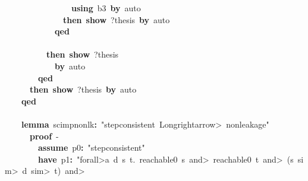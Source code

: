 \documentclass{article}
\newcommand{\syntaxKEYWORDA}[1]{\textcolor[rgb]{0.0,0.4,0.6}{\textbf{#1}}}
\newcommand{\syntaxKEYWORDC}[1]{\textcolor[rgb]{0.0,0.6,1.0}{\textbf{#1}}}
\newcommand{\syntaxLITERALA}[1]{\textcolor[rgb]{1.0,0.0,0.8}{#1}}
\newcommand{\syntaxOPERATOR}[1]{\textcolor[rgb]{0.0,0.0,0.0}{\textbf{#1}}}
\newcommand{\syntaxKEYWORDA}[1]{\textcolor[rgb]{0.0,0.4,0.6}{\textbf{#1}}}
\newcommand{\syntaxKEYWORDC}[1]{\textcolor[rgb]{0.0,0.6,1.0}{\textbf{#1}}}
\newcommand{\syntaxLITERALA}[1]{\textcolor[rgb]{1.0,0.0,0.8}{#1}}
\newcommand{\syntaxOPERATOR}[1]{\textcolor[rgb]{0.0,0.0,0.0}{\textbf{#1}}}
\newcommand{\syntaxKEYWORDA}[1]{\textcolor[rgb]{0.0,0.4,0.6}{\textbf{#1}}}
\newcommand{\syntaxKEYWORDC}[1]{\textcolor[rgb]{0.0,0.6,1.0}{\textbf{#1}}}
\newcommand{\syntaxLITERALA}[1]{\textcolor[rgb]{1.0,0.0,0.8}{#1}}
\newcommand{\syntaxOPERATOR}[1]{\textcolor[rgb]{0.0,0.0,0.0}{\textbf{#1}}}
\newcommand{\syntaxKEYWORDA}[1]{\textcolor[rgb]{0.0,0.4,0.6}{#1}}
\newcommand{\syntaxKEYWORDC}[1]{\textcolor[rgb]{0.0,0.6,1.0}{#1}}
\newcommand{\syntaxLITERALA}[1]{\textcolor[rgb]{1.0,0.0,0.8}{\textbf{#1}}}
\newcommand{\syntaxOPERATOR}[1]{\textcolor[rgb]{0.0,0.0,0.0}{#1}}
\newcommand{\syntaxKEYWORDA}[1]{\textcolor[rgb]{0.0,0.4,0.6}{\textbf{#1}}}
\newcommand{\syntaxKEYWORDC}[1]{\textcolor[rgb]{0.0,0.6,1.0}{\textbf{#1}}}
\newcommand{\syntaxLITERALA}[1]{\textcolor[rgb]{1.0,0.0,0.8}{#1}}
\newcommand{\syntaxOPERATOR}[1]{\textcolor[rgb]{0.0,0.0,0.0}{\textbf{#1}}}
\newcommand{\syntaxKEYWORDA}[1]{\textcolor[rgb]{0.0,0.4,0.6}{\textbf{#1}}}
\newcommand{\syntaxKEYWORDC}[1]{\textcolor[rgb]{0.0,0.6,1.0}{\textbf{#1}}}
\newcommand{\syntaxLITERALA}[1]{\textcolor[rgb]{1.0,0.0,0.8}{#1}}
\newcommand{\syntaxOPERATOR}[1]{\textcolor[rgb]{0.0,0.0,0.0}{\textbf{#1}}}
\begin{document}
{\ }{\ }{\ }{\ }{\ }{\ }{\ }{\ }{\ }{\ }{\ }{\ }{\ }{\ }{\ }{\ }\syntaxKEYWORDA{using}{\ }b3{\ }\syntaxKEYWORDA{by}{\ }auto\hspace*{\fill}\\
{\ }{\ }{\ }{\ }{\ }{\ }{\ }{\ }{\ }{\ }{\ }{\ }{\ }{\ }\syntaxKEYWORDA{then}{\ }\syntaxKEYWORDC{show}{\ }?thesis{\ }\syntaxKEYWORDA{by}{\ }auto\hspace*{\fill}\\
{\ }{\ }{\ }{\ }{\ }{\ }{\ }{\ }{\ }{\ }{\ }{\ }\syntaxKEYWORDA{qed}\hspace*{\fill}\\
{\ }{\ }{\ }{\ }{\ }{\ }{\ }{\ }{\ }{\ }{\ }{\ }\syntaxKEYWORDA{\usebox{\closecurlybracket}}\hspace*{\fill}\\
{\ }{\ }{\ }{\ }{\ }{\ }{\ }{\ }{\ }{\ }\syntaxKEYWORDA{then}{\ }\syntaxKEYWORDC{show}{\ }?thesis{\ }\hspace*{\fill}\\
{\ }{\ }{\ }{\ }{\ }{\ }{\ }{\ }{\ }{\ }{\ }{\ }\syntaxKEYWORDA{by}{\ }auto\hspace*{\fill}\\
{\ }{\ }{\ }{\ }{\ }{\ }{\ }{\ }\syntaxKEYWORDA{qed}\hspace*{\fill}\\
{\ }{\ }{\ }{\ }{\ }{\ }\syntaxKEYWORDA{then}{\ }\syntaxKEYWORDC{show}{\ }?thesis{\ }\syntaxKEYWORDA{by}{\ }auto\hspace*{\fill}\\
{\ }{\ }{\ }{\ }\syntaxKEYWORDA{qed}\hspace*{\fill}\\
\hspace*{\fill}\\
{\ }{\ }{\ }{\ }\syntaxKEYWORDA{lemma}{\ }sc\usebox{\underscorebox}imp\usebox{\underscorebox}nonlk\syntaxOPERATOR{:}{\ }\syntaxLITERALA{"step\usebox{\underscorebox}consistent{\ }\<Longrightarrow>{\ }nonleakage"}{\ }\hspace*{\fill}\\
{\ }{\ }{\ }{\ }{\ }{\ }\syntaxKEYWORDA{proof}{\ }{-}\hspace*{\fill}\\
{\ }{\ }{\ }{\ }{\ }{\ }{\ }{\ }\syntaxKEYWORDC{assume}{\ }p0\syntaxOPERATOR{:}{\ }\syntaxLITERALA{"step\usebox{\underscorebox}consistent"}\hspace*{\fill}\\
{\ }{\ }{\ }{\ }{\ }{\ }{\ }{\ }\syntaxKEYWORDA{have}{\ }p1\syntaxOPERATOR{:}{\ }\syntaxLITERALA{"\<forall>a{\ }d{\ }s{\ }t.{\ }reachable0{\ }s{\ }\<and>{\ }reachable0{\ }t{\ }\<and>{\ }(s{\ }\<sim>{\ }d{\ }\<sim>{\ }t){\ }\<and>}\hspace*{\fill}\\
\end{document}
